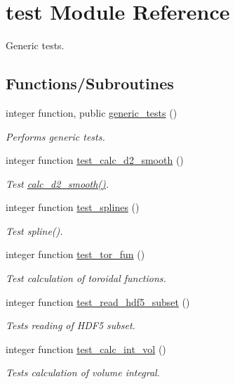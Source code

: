 \hypertarget{namespacetest}{}\section{test Module Reference}
\label{namespacetest}


Generic tests.  


\subsection*{Functions/\+Subroutines}
\begin{DoxyCompactItemize}
\item 
integer function, public \hyperlink{namespacetest_aca21ee464c0b1f4b617177afdde110ec}{generic\+\_\+tests} ()
\begin{DoxyCompactList}\small\item\em Performs generic tests. \end{DoxyCompactList}\item 
integer function \hyperlink{namespacetest_a1c04fcea513c8c2efb189049d810318a}{test\+\_\+calc\+\_\+d2\+\_\+smooth} ()
\begin{DoxyCompactList}\small\item\em Test \hyperlink{namespacenum__utilities_ab4c91a6478c4dd6f519f8ccbccc4094f}{calc\+\_\+d2\+\_\+smooth()}. \end{DoxyCompactList}\item 
integer function \hyperlink{namespacetest_a53c6b3d654d4577af301fe3b04473d6a}{test\+\_\+splines} ()
\begin{DoxyCompactList}\small\item\em Test spline(). \end{DoxyCompactList}\item 
integer function \hyperlink{namespacetest_ab595ec935321ea0b1168593fb88fad22}{test\+\_\+tor\+\_\+fun} ()
\begin{DoxyCompactList}\small\item\em Test calculation of toroidal functions. \end{DoxyCompactList}\item 
integer function \hyperlink{namespacetest_ac574f08ba400cd61070a6a6f13f6f7ee}{test\+\_\+read\+\_\+hdf5\+\_\+subset} ()
\begin{DoxyCompactList}\small\item\em Tests reading of H\+D\+F5 subset. \end{DoxyCompactList}\item 
integer function \hyperlink{namespacetest_a0d4cb791bf762b2e52260fea7644a3ee}{test\+\_\+calc\+\_\+int\+\_\+vol} ()
\begin{DoxyCompactList}\small\item\em Tests calculation of volume integral. \end{DoxyCompactList}\end{DoxyCompactItemize}


